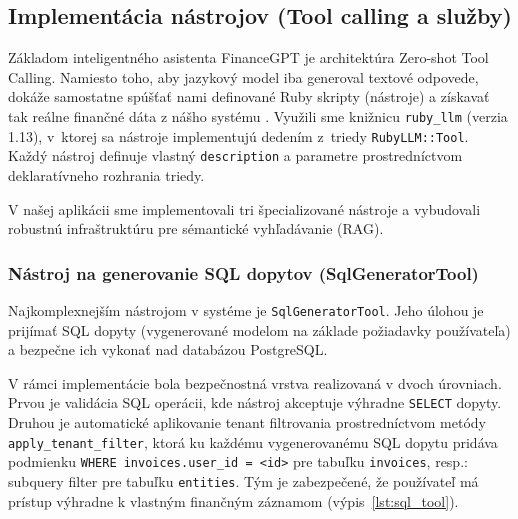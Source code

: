 \subsection{Implementácia nástrojov (Tool calling a služby)}
Základom inteligentného asistenta FinanceGPT je architektúra Zero-shot Tool
Calling. Namiesto toho, aby jazykový model iba generoval textové odpovede, dokáže
samostatne spúšťať nami definované Ruby skripty (nástroje) a získavať tak reálne finančné
dáta z nášho systému \cite{zhao2023}. Využili sme knižnicu \texttt{ruby\_llm} (verzia
1.13), v~ktorej sa nástroje implementujú dedením z~triedy \texttt{RubyLLM::Tool}.
Každý nástroj definuje vlastný \texttt{description} a parametre prostredníctvom deklaratívneho
rozhrania triedy.

V našej aplikácii sme implementovali tri špecializované nástroje a vybudovali robustnú
infraštruktúru pre sémantické vyhľadávanie (RAG).

\subsubsection{Nástroj na generovanie SQL dopytov (SqlGeneratorTool)}
Najkomplexnejším nástrojom v systéme je \texttt{SqlGeneratorTool}. Jeho úlohou je
prijímať SQL dopyty (vygenerované modelom na základe požiadavky používateľa) a bezpečne
ich vykonať nad databázou PostgreSQL.

V rámci implementácie bola bezpečnostná vrstva realizovaná v dvoch úrovniach.
Prvou je validácia SQL operácii, kde nástroj akceptuje výhradne \texttt{SELECT}
dopyty. Druhou je automatické aplikovanie tenant filtrovania prostredníctvom metódy
\texttt{apply\_tenant\_filter}, ktorá ku každému vygenerovanému SQL dopytu pridáva
podmienku \texttt{WHERE invoices.user\_id = <id>} pre tabuľku \texttt{invoices},
resp.: subquery filter pre tabuľku \texttt{entities}. Tým je zabezpečené, že používateľ
má prístup výhradne k vlastným finančným záznamom (výpis~\ref{lst:sql_tool}).

